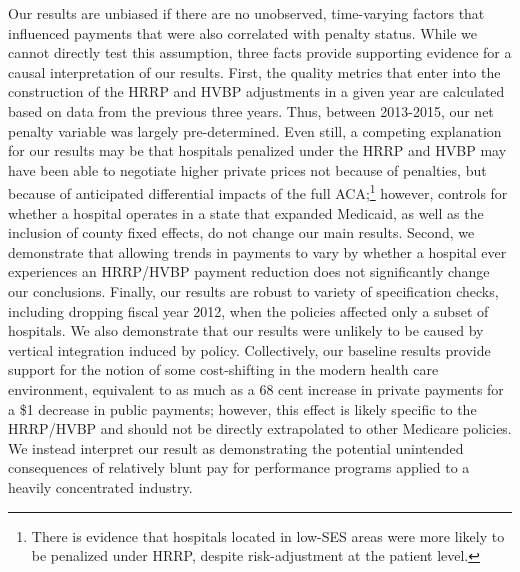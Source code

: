 \documentclass[12pt]{article}
\begin{document}
Our results are unbiased if there are no unobserved, time-varying factors that influenced payments that were also correlated with penalty status.  While we cannot directly test this assumption, three facts provide supporting evidence for a causal interpretation of our results.  First, the quality metrics that enter into the construction of the HRRP and HVBP adjustments in a given year are calculated based on data from the previous three years.  Thus, between 2013-2015, our net penalty variable was largely pre-determined.  Even still, a competing explanation for our results may be that hospitals penalized under the HRRP and HVBP may have been able to negotiate higher private prices not because of penalties, but because of anticipated differential impacts of the full ACA;\footnote{There is evidence that hospitals located in low-SES areas were more likely to be penalized under HRRP, despite risk-adjustment at the patient level.} however, controls for whether a hospital operates in a state that expanded Medicaid, as well as the inclusion of county fixed effects, do not change our main results. Second, we demonstrate that allowing trends in payments to vary by whether a hospital ever experiences an HRRP/HVBP payment reduction does not significantly change our conclusions. Finally, our results are robust to variety of specification checks, including dropping fiscal year 2012, when the policies affected only a subset of hospitals.  We also demonstrate that our results were unlikely to be caused by vertical integration induced by policy.  Collectively, our baseline results provide support for the notion of some cost-shifting in the modern health care environment, equivalent to as much as a 68 cent increase in private payments for a \$1 decrease in public payments; however, this effect is likely specific to the HRRP/HVBP and should not be directly extrapolated to other Medicare policies. We instead interpret our result as demonstrating the potential unintended consequences of relatively blunt pay for performance programs applied to a heavily concentrated industry.
\end{document}
